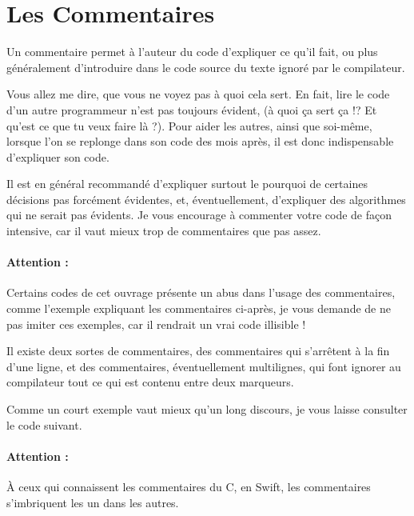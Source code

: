 \section{Les Commentaires}
Un commentaire permet à l’auteur du code d’expliquer ce qu’il fait,
ou plus généralement d’introduire dans le code source
du texte ignoré par le compilateur.

Vous allez me dire, que vous ne voyez pas à quoi cela sert.
En fait, lire le code d’un autre programmeur n’est pas toujours évident,
(à quoi ça sert ça !? Et qu’est ce que tu veux faire là ?).
Pour aider les autres, ainsi que soi-même,
lorsque l'on se replonge dans son code des mois après,
il est donc indispensable d’expliquer son code.

Il est en général recommandé d'expliquer surtout
le pourquoi de certaines décisions pas forcément évidentes,
et, éventuellement, d'expliquer des algorithmes qui ne serait pas évidents.
Je vous encourage à commenter votre code de façon intensive,
car il vaut mieux trop de commentaires que pas assez.

\paragraph{Attention :}
Certains codes de cet ouvrage présente un abus dans l'usage des commentaires,
comme l'exemple expliquant les commentaires ci-après,
je vous demande de ne pas imiter ces exemples,
car il rendrait un vrai code illisible !

Il existe deux sortes de commentaires,
des commentaires qui s'arrêtent à la fin d'une ligne,
et des commentaires, éventuellement multilignes,
qui font ignorer au compilateur tout ce qui est contenu entre deux marqueurs.

Comme un court exemple vaut mieux qu’un long discours,
je vous laisse consulter le code suivant.

\paragraph{Attention :} À ceux qui connaissent les commentaires du C,
en Swift, les commentaires s'imbriquent les un dans les autres.

